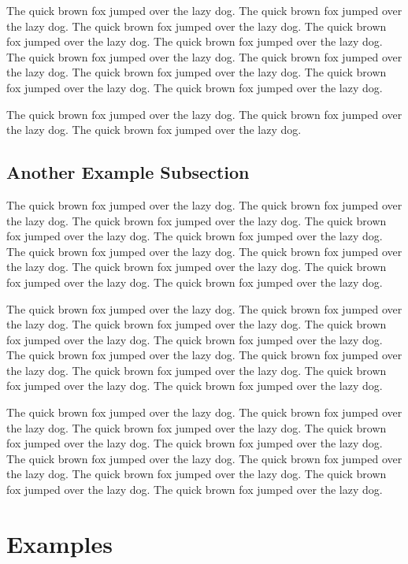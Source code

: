 \documentclass[
  12pt]{article}
\begin{document}
The quick brown fox jumped over the lazy dog. The quick brown fox jumped
over the lazy dog. The quick brown fox jumped over the lazy dog. The
quick brown fox jumped over the lazy dog. The quick brown fox jumped
over the lazy dog. The quick brown fox jumped over the lazy dog. The
quick brown fox jumped over the lazy dog. The quick brown fox jumped
over the lazy dog. The quick brown fox jumped over the lazy dog. The
quick brown fox jumped over the lazy dog.

The quick brown fox jumped over the lazy dog. The quick brown fox jumped
over the lazy dog. The quick brown fox jumped over the lazy dog.

\subsection{Another Example
Subsection}\label{another-example-subsection}

The quick brown fox jumped over the lazy dog. The quick brown fox jumped
over the lazy dog. The quick brown fox jumped over the lazy dog. The
quick brown fox jumped over the lazy dog. The quick brown fox jumped
over the lazy dog. The quick brown fox jumped over the lazy dog. The
quick brown fox jumped over the lazy dog. The quick brown fox jumped
over the lazy dog. The quick brown fox jumped over the lazy dog. The
quick brown fox jumped over the lazy dog.

The quick brown fox jumped over the lazy dog. The quick brown fox jumped
over the lazy dog. The quick brown fox jumped over the lazy dog. The
quick brown fox jumped over the lazy dog. The quick brown fox jumped
over the lazy dog. The quick brown fox jumped over the lazy dog. The
quick brown fox jumped over the lazy dog. The quick brown fox jumped
over the lazy dog. The quick brown fox jumped over the lazy dog. The
quick brown fox jumped over the lazy dog.

The quick brown fox jumped over the lazy dog. The quick brown fox jumped
over the lazy dog. The quick brown fox jumped over the lazy dog. The
quick brown fox jumped over the lazy dog. The quick brown fox jumped
over the lazy dog. The quick brown fox jumped over the lazy dog. The
quick brown fox jumped over the lazy dog. The quick brown fox jumped
over the lazy dog. The quick brown fox jumped over the lazy dog. The
quick brown fox jumped over the lazy dog.

\section{Examples}\label{examples}
\end{document}
